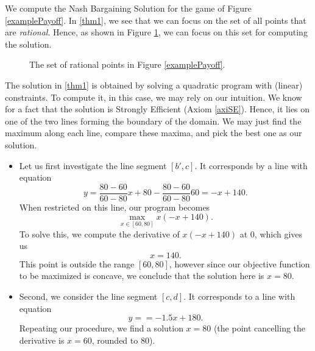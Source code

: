 \begin{example}
We compute the Nash Bargaining Solution for the game of Figure \ref{examplePayoff}.
In \eqref{thm1}, we see that we can focus on the set of all points that are \emph{rational}. Hence, as shown in Figure \ref{example2Payoff}, we can focus on this set for computing the solution.

\begin{figure}[!ht]
\centering
{}
\caption{The set of rational points in Figure \ref{examplePayoff}.}
\label{example2Payoff}
\end{figure}

The solution in \eqref{thm1} is obtained by solving a quadratic program with (linear) constraints.
To compute it,  in this case, we may rely on our intuition.
We know for a fact that the solution is Strongly Efficient (Axiom \ref{axiSE}). Hence, it lies on one of the two lines forming the boundary of the domain.
We may just find the maximum along each line, compare these maxima, and pick the best one as our solution.

\begin{itemize}
\item Let us first investigate the line segment $[b',c]$. It corresponds by a line with equation
$$ y = \frac{80 - 60}{60 - 80} x + 80 - \frac{80 - 60}{60 - 80} 60 = - x + 140. $$
When restricted on this line, our program becomes
$$ \max_{x \in [60,80]} x (- x + 140). $$
To solve this, we compute the derivative of $x (- x + 140)$ at $0$, which gives us
$$  x = 140. $$
This point is outside the range $[60,80]$, however since our objective function to be maximized is concave, we conclude that the solution here is $x = 80$.
\item Second, we consider the line segment $[c,d]$. It corresponds to a line with equation
$$ y =  = -1.5 x + 180. $$
Repeating our procedure, we find a solution $x = 80$ (the point cancelling the derivative is $x = 60$, rounded to 80).


\end{itemize}
\end{example}
